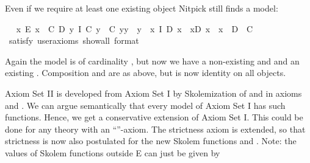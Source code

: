 \begin{isabellebody}
\begin{isamarkuptext}
Even if we require at least one existing object Nitpick still finds a model:%
\end{isamarkuptext}\isamarkuptrue%
\ \isamarkupfalse%
\ {\isachardoublequoteopen}{\isacharparenleft}{\isasymexists}x{\isachardot}\ E\ x{\isacharparenright}\ \isactrlbold {\isasymand}\ {\isacharparenleft}{\isasymexists}C\ D{\isachardot}\ {\isacharparenleft}\isactrlbold {\isasymforall}y{\isachardot}\ I\ {\isacharparenleft}C\ y{\isacharparenright}\ \isactrlbold {\isasymand}\ {\isacharparenleft}C\ y{\isacharparenright}{\isasymcdot}y\ {\isasymcong}\ y{\isacharparenright}\ \isactrlbold {\isasymand}\ {\isacharparenleft}\isactrlbold {\isasymforall}x{\isachardot}\ I\ {\isacharparenleft}D\ x{\isacharparenright}\ \isactrlbold {\isasymand}\ x{\isasymcdot}{\isacharparenleft}D\ x{\isacharparenright}\ {\isasymcong}\ x{\isacharparenright}\ \isactrlbold {\isasymand}\ \isactrlbold {\isasymnot}{\isacharparenleft}D\ {\isacharequal}\ C{\isacharparenright}{\isacharparenright}{\isachardoublequoteclose}\isanewline
\ \ \ \isamarkupfalse%
\ {\isacharbrackleft}satisfy{\isacharcomma}\ user{\isacharunderscore}axioms{\isacharcomma}\ show{\isacharunderscore}all{\isacharcomma}\ format\ {\isacharequal}\ {}{\isacharbrackright}%
\isadelimproof
\ %
\endisadelimproof
%
\isatagproof
{}\isamarkupfalse%
\ \ %
%
\endisatagproof
{\isafoldproof}%
%
\isadelimproof
%
\endisadelimproof
%
\begin{isamarkuptext}%
Again the model is of cardinality , but now we have a non-existing  and 
  and an existing . Composition \isa{{\isasymcdot}} and  are as above, but 
   is now identity on all objects.%
\end{isamarkuptext}\isamarkuptrue%
%
\isamarkuptrue%
%
\begin{isamarkuptext}%
Axiom Set II is developed from Axiom Set I by Skolemization of  and  
 in axioms  and . We can argue semantically that every model of Axiom Set I has such 
 functions. Hence, we get a conservative extension of Axiom Set I. This could be done for any 
 theory with an ``''-axiom. The strictness axiom  is extended, 
 so that strictness is now also postulated for the new Skolem functions  
 and . Note: the values of Skolem functions outside E can just be given by 

\end{isamarkuptext}
\end{isabellebody}
